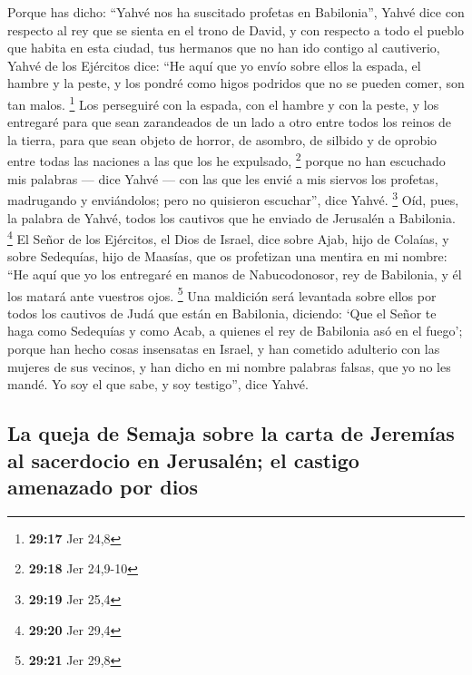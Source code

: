  Porque has dicho: ``Yahvé nos ha suscitado profetas en
Babilonia'',  Yahvé dice con respecto al rey que se
sienta en el trono de David, y con respecto a todo el pueblo que habita
en esta ciudad, tus hermanos que no han ido contigo al cautiverio,
 Yahvé de los Ejércitos dice: ``He aquí que yo envío
sobre ellos la espada, el hambre y la peste, y los pondré como higos
podridos que no se pueden comer, son tan malos. \footnote{\textbf{29:17}
  Jer 24,8}  Los perseguiré con la espada, con el hambre
y con la peste, y los entregaré para que sean zarandeados de un lado a
otro entre todos los reinos de la tierra, para que sean objeto de
horror, de asombro, de silbido y de oprobio entre todas las naciones a
las que los he expulsado, \footnote{\textbf{29:18} Jer 24,9-10}
 porque no han escuchado mis palabras --- dice Yahvé ---
con las que les envié a mis siervos los profetas, madrugando y
enviándolos; pero no quisieron escuchar'', dice Yahvé. \footnote{\textbf{29:19}
  Jer 25,4}  Oíd, pues, la palabra de Yahvé, todos los
cautivos que he enviado de Jerusalén a Babilonia. \footnote{\textbf{29:20}
  Jer 29,4}  El Señor de los Ejércitos, el Dios de
Israel, dice sobre Ajab, hijo de Colaías, y sobre Sedequías, hijo de
Maasías, que os profetizan una mentira en mi nombre: ``He aquí que yo
los entregaré en manos de Nabucodonosor, rey de Babilonia, y él los
matará ante vuestros ojos. \footnote{\textbf{29:21} Jer 29,8}
 Una maldición será levantada sobre ellos por todos los
cautivos de Judá que están en Babilonia, diciendo: `Que el Señor te haga
como Sedequías y como Acab, a quienes el rey de Babilonia asó en el
fuego';  porque han hecho cosas insensatas en Israel, y
han cometido adulterio con las mujeres de sus vecinos, y han dicho en mi
nombre palabras falsas, que yo no les mandé. Yo soy el que sabe, y soy
testigo'', dice Yahvé.

\hypertarget{la-queja-de-semaja-sobre-la-carta-de-jeremuxedas-al-sacerdocio-en-jerusaluxe9n-el-castigo-amenazado-por-dios}{%
\subsection{La queja de Semaja sobre la carta de Jeremías al sacerdocio
en Jerusalén; el castigo amenazado por
dios}\label{la-queja-de-semaja-sobre-la-carta-de-jeremuxedas-al-sacerdocio-en-jerusaluxe9n-el-castigo-amenazado-por-dios}}

